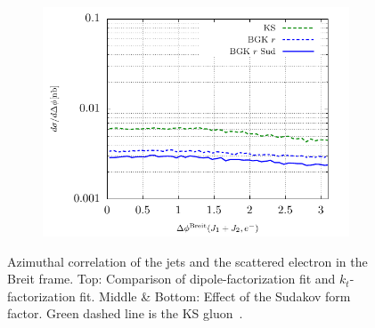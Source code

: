 \documentclass[11pt]{article}
\numberwithin{equation}{section}
\numberwithin{table}{section}
\numberwithin{figure}{section}
\begin{document}
\begin{figure}[p]
\begin{subfigure}{0.5\textwidth}
	\end{subfigure}
	\begin{subfigure}{0.5\textwidth}
	\includegraphics[width=\textwidth]{plots/plotBGK3}
	\end{subfigure}
	\caption{\footnotesize Azimuthal correlation of the jets and the scattered electron in the Breit frame. Top: Comparison of dipole-factorization fit and $k_t$-factorization fit. Middle \& Bottom: Effect of the Sudakov form factor.   Green dashed line is the KS gluon~\cite{vanHameren:2021sqc}.}
	\label{fig:je-breit}
\end{figure}
\end{document}
